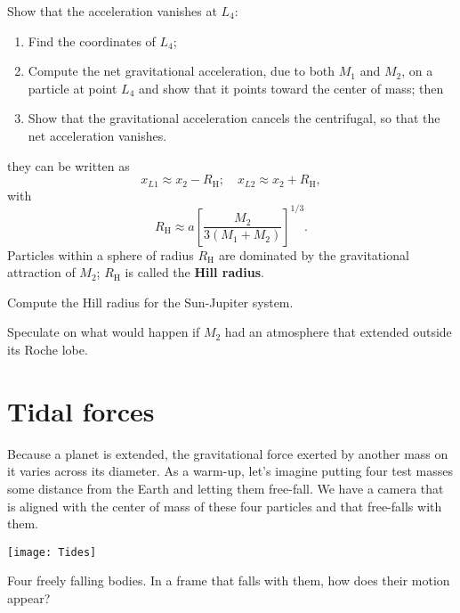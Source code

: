 \begin{exercisebox}
Show that the acceleration vanishes at $L_{4}$:
\begin{enumerate}\renewcommand{\labelenumi}{\alph{enumi})}
   \item Find the coordinates of $L_{4}$;
   \item Compute the net gravitational acceleration, due to both $M_{1}$ and $M_{2}$, on a particle at point $L_{4}$ and show that it points toward the center of mass; then
   \item Show that the gravitational acceleration cancels the centrifugal, so that the net acceleration vanishes.
\end{enumerate}
\end{exercisebox}

 they can be written
as
\[ 
	x_{L1} \approx x_{2} - R_{\mathrm{H}};\quad x_{L2}\approx x_{2} + R_{\mathrm{H}},
\]
with
\[ R_{\mathrm{H}}\approx a\left[\frac{M_{2}}{3(M_{1}+M_{2})}\right]^{1/3}. \]
Particles within a sphere of radius $R_{\mathrm{H}}$ are dominated by the gravitational attraction of $M_{2}$; $R_{\mathrm{H}}$ is called the \textbf{Hill radius}.

\begin{exercisebox}
Compute the Hill radius for the Sun-Jupiter system.
\end{exercisebox}

\begin{exercisebox}
Speculate on what would happen if $M_{2}$ had an atmosphere that extended outside its Roche lobe.
\end{exercisebox}

\section{Tidal forces}
Because a planet is extended, the gravitational force exerted by another mass on it varies across its diameter. As a warm-up, let's imagine putting four test masses some distance from the Earth and letting them free-fall.  We have a camera that is aligned with the center of mass of these four particles and that free-falls with them.
\begin{marginfigure}
\texttt{[image: Tides]}
\caption[Four freely falling bodies]{Four freely falling bodies.  In a frame that falls with them, how does their motion appear?
\label{f.tides}}
\end{marginfigure}

